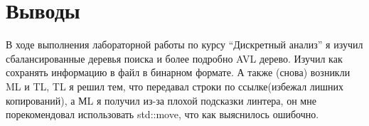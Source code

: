 \section{Выводы}
В ходе выполнения лабораторной работы по курсу \enquote{Дискретный анализ} я изучил сбалансированные деревья поиска и более подробно AVL дерево. Изучил как сохранять информацию в файл в бинарном формате.
А также (снова) возникли ML и TL, TL я решил тем, что передавал строки по ссылке(избежал лишних копирований), а МL я получил из-за плохой подсказки линтера, он мне порекомендовал использовать std::move, что как выяснилось ошибочно.
\pagebreak
